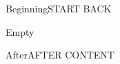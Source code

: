 \documentclass{pnpcards}
\begin{document}
\begin{card}{Beginning}\newpage START BACK\end{card}
\begin{card}{Empty}\end{card}
\EnableCardDebugFrames
\begin{card}{After}AFTER CONTENT\end{card}
\end{document}
